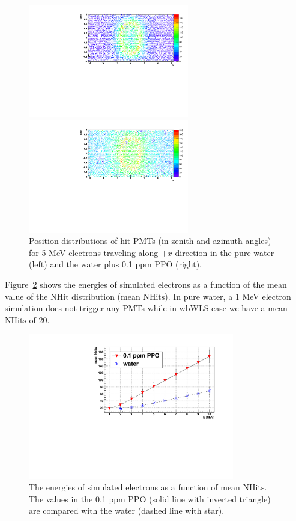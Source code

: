\begin{figure}[htbp]
	\centering
	\begin{minipage}[t]{0.48\textwidth}
		\centering
		\includegraphics[width=7cm]{PMT_5MeVElectronWater.pdf}
	\end{minipage}
	\begin{minipage}[t]{0.48\textwidth}
		\centering
		\includegraphics[width=7cm]{PMT_5MeVElectron0p1ppmPPO.pdf}
	\end{minipage}
	\caption{Position distributions of hit PMTs (in zenith and azimuth angles) for 5 MeV electrons traveling along $+x$ direction in the pure water (left) and the water plus 0.1 ppm PPO (right).}
	\label{pmt_wls}
\end{figure}

Figure~\ref{nhit_wls} shows the energies of simulated electrons as a function of the mean value of the $\mathrm{NHit}$ distribution (mean $\mathrm{NHits}$). In pure water, a 1 MeV electron simulation does not trigger any PMTs while in wbWLS case we have a mean $\mathrm{NHits}$ of 20.

\begin{figure}[htbp]
	\centering	
	\includegraphics[width=9cm]{nhits_wls.pdf}
	\caption{ The energies of simulated electrons as a function of mean $\mathrm{NHits}$. The values in the 0.1 ppm PPO (solid line with inverted triangle) are compared with the water (dashed line with star).}
	\label{nhit_wls}
\end{figure}

